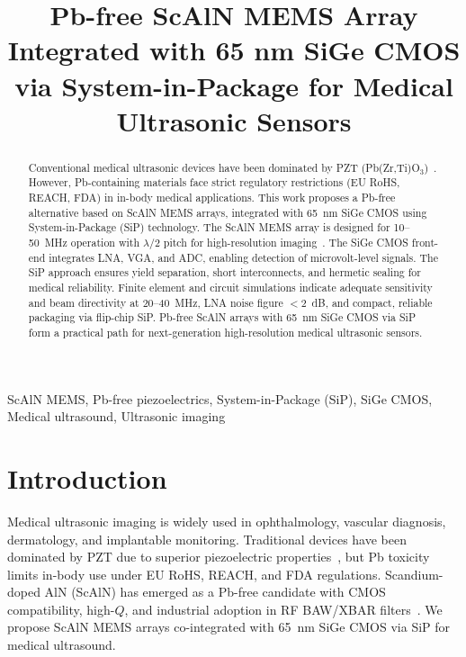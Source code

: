 \documentclass[conference]{IEEEtran}
\begin{document}
\title{Pb-free ScAlN MEMS Array Integrated with 65 nm SiGe CMOS via System-in-Package for Medical Ultrasonic Sensors}

\author{
}

\maketitle

\begin{abstract}
Conventional medical ultrasonic devices have been dominated by PZT (Pb(Zr,Ti)O$_3$)~\cite{akata2009pzt}. However, Pb-containing materials face strict regulatory restrictions (EU RoHS, REACH, FDA) in in-body medical applications. This work proposes a Pb-free alternative based on ScAlN MEMS arrays, integrated with 65~nm SiGe CMOS using System-in-Package (SiP) technology. The ScAlN MEMS array is designed for 10--50~MHz operation with $\lambda/2$ pitch for high-resolution imaging~\cite{akrout2018scaln}. The SiGe CMOS front-end integrates LNA, VGA, and ADC, enabling detection of microvolt-level signals. The SiP approach ensures yield separation, short interconnects, and hermetic sealing for medical reliability. Finite element and circuit simulations indicate adequate sensitivity and beam directivity at 20--40~MHz, LNA noise figure $<2$~dB, and compact, reliable packaging via flip-chip SiP. Pb-free ScAlN arrays with 65~nm SiGe CMOS via SiP form a practical path for next-generation high-resolution medical ultrasonic sensors.
\end{abstract}

\begin{IEEEkeywords}
ScAlN MEMS, Pb-free piezoelectrics, System-in-Package (SiP), SiGe CMOS, Medical ultrasound, Ultrasonic imaging
\end{IEEEkeywords}

\section{Introduction}
Medical ultrasonic imaging is widely used in ophthalmology, vascular diagnosis, dermatology, and implantable monitoring. Traditional devices have been dominated by PZT due to superior piezoelectric properties~\cite{akata2009pzt}, but Pb toxicity limits in-body use under EU RoHS, REACH, and FDA regulations. Scandium-doped AlN (ScAlN) has emerged as a Pb-free candidate with CMOS compatibility, high-$Q$, and industrial adoption in RF BAW/XBAR filters~\cite{akrout2018scaln}. We propose ScAlN MEMS arrays co-integrated with 65~nm SiGe CMOS via SiP for medical ultrasound.
\end{document}
